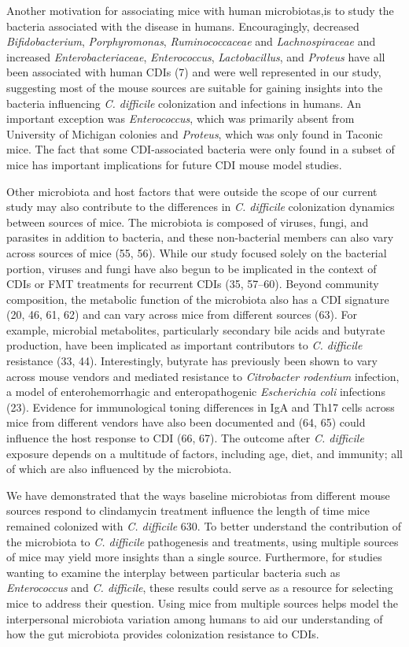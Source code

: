 \documentclass[
  11pt,
]{article}
\begin{document}
Another motivation for associating mice with human microbiotas,is to
study the bacteria associated with the disease in humans. Encouragingly,
decreased \emph{Bifidobacterium}, \emph{Porphyromonas},
\emph{Ruminococcaceae} and \emph{Lachnospiraceae} and increased
\emph{Enterobacteriaceae}, \emph{Enterococcus}, \emph{Lactobacillus},
and \emph{Proteus} have all been associated with human CDIs (7) and were
well represented in our study, suggesting most of the mouse sources are
suitable for gaining insights into the bacteria influencing \emph{C.
difficile} colonization and infections in humans. An important exception
was \emph{Enterococcus}, which was primarily absent from University of
Michigan colonies and \emph{Proteus}, which was only found in Taconic
mice. The fact that some CDI-associated bacteria were only found in a
subset of mice has important implications for future CDI mouse model
studies.

Other microbiota and host factors that were outside the scope of our
current study may also contribute to the differences in \emph{C.
difficile} colonization dynamics between sources of mice. The microbiota
is composed of viruses, fungi, and parasites in addition to bacteria,
and these non-bacterial members can also vary across sources of mice
(55, 56). While our study focused solely on the bacterial portion,
viruses and fungi have also begun to be implicated in the context of
CDIs or FMT treatments for recurrent CDIs (35, 57--60). Beyond community
composition, the metabolic function of the microbiota also has a CDI
signature (20, 46, 61, 62) and can vary across mice from different
sources (63). For example, microbial metabolites, particularly secondary
bile acids and butyrate production, have been implicated as important
contributors to \emph{C. difficile} resistance (33, 44). Interestingly,
butyrate has previously been shown to vary across mouse vendors and
mediated resistance to \emph{Citrobacter rodentium} infection, a model
of enterohemorrhagic and enteropathogenic \emph{Escherichia coli}
infections (23). Evidence for immunological toning differences in IgA
and Th17 cells across mice from different vendors have also been
documented and (64, 65) could influence the host response to CDI (66,
67). The outcome after \emph{C. difficile} exposure depends on a
multitude of factors, including age, diet, and immunity; all of which
are also influenced by the microbiota.

We have demonstrated that the ways baseline microbiotas from different
mouse sources respond to clindamycin treatment influence the length of
time mice remained colonized with \emph{C. difficile} 630. To better
understand the contribution of the microbiota to \emph{C. difficile}
pathogenesis and treatments, using multiple sources of mice may yield
more insights than a single source. Furthermore, for studies wanting to
examine the interplay between particular bacteria such as
\emph{Enterococcus} and \emph{C. difficile}, these results could serve
as a resource for selecting mice to address their question. Using mice
from multiple sources helps model the interpersonal microbiota variation
among humans to aid our understanding of how the gut microbiota provides
colonization resistance to CDIs.
\end{document}
